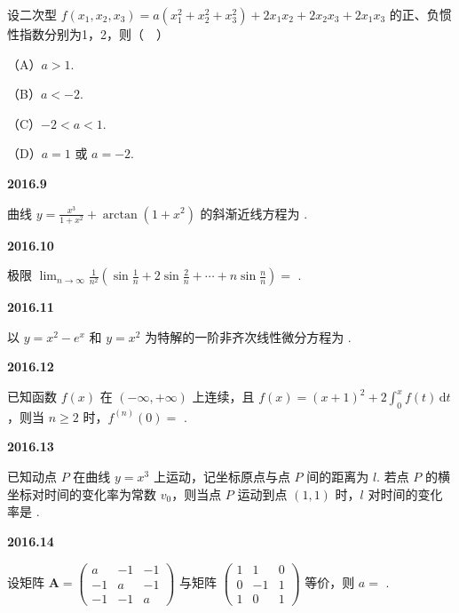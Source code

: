 \documentclass[UTF8,12pt,fontset=windows]{ctexart}
\begin{document}
设二次型 $f(x_1, x_2, x_3) = a(x_1^2 + x_2^2 + x_3^2) + 2x_1x_2 + 2x_2x_3 + 2x_1x_3$ 的正、负惯性指数分别为1，2，则（　）

（A）$a > 1$.

（B）$a < -2$.

（C）$-2 < a < 1$.

（D）$a = 1$ 或 $a = -2$.

\vfill
\newpage
{\large\bfseries 2016.9}

曲线 $y = \frac{x^3}{1 + x^2} + \arctan(1 + x^2)$ 的斜渐近线方程为 \underline{\hspace{20mm}}.

\vfill
\newpage
{\large\bfseries 2016.10}

极限 $\lim_{n \to \infty} \frac{1}{n^2}\left(\sin\frac{1}{n} + 2\sin\frac{2}{n} + \cdots + n\sin\frac{n}{n}\right) =$ \underline{\hspace{20mm}}.

\vfill
\newpage
{\large\bfseries 2016.11}

以 $y = x^2 - e^x$ 和 $y = x^2$ 为特解的一阶非齐次线性微分方程为 \underline{\hspace{20mm}}.

\vfill
\newpage
{\large\bfseries 2016.12}

已知函数 $f(x)$ 在 $(-\infty, +\infty)$ 上连续，且 $f(x) = (x + 1)^2 + 2\int_0^x f(t)\,\mathrm{d}t$，则当 $n \geqslant 2$ 时，$f^{(n)}(0) =$ \underline{\hspace{20mm}}.

\vfill
\newpage
{\large\bfseries 2016.13}

已知动点 $P$ 在曲线 $y = x^3$ 上运动，记坐标原点与点 $P$ 间的距离为 $l$. 若点 $P$ 的横坐标对时间的变化率为常数 $v_0$，则当点 $P$ 运动到点 $(1, 1)$ 时，$l$ 对时间的变化率是 \underline{\hspace{20mm}}.

\vfill
\newpage
{\large\bfseries 2016.14}

设矩阵 $\boldsymbol{A} = \begin{pmatrix} a & -1 & -1 \\ -1 & a & -1 \\ -1 & -1 & a \end{pmatrix}$ 与矩阵 $\begin{pmatrix} 1 & 1 & 0 \\ 0 & -1 & 1 \\ 1 & 0 & 1 \end{pmatrix}$ 等价，则 $a =$ \underline{\hspace{20mm}}.
\end{document}
